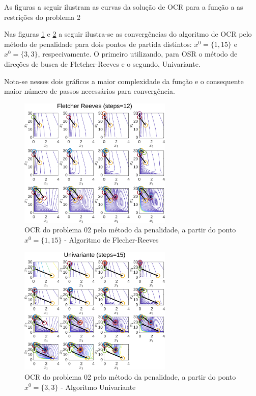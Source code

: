 \documentclass[10pt, a4paper]{article}
\begin{document}
\newpage

As figuras a seguir ilustram as curvas da solu\c c\~ao de OCR para a fun\c c\~ao a as restri\c c\~oes do problema 2

Nas figuras \ref{fig:fig05} e \ref{fig:fig06} a seguir ilustra-se as converg\^encias do algoritmo de OCR pelo m\'etodo de penalidade para dois pontos de partida distintos: $x^0=\{1,15\}$ e $x^0=\{3,3\}$, respecivamente. O primeiro utilizando, para OSR o m\'etodo de dire\c c\~oes de busca de Fletcher-Reeves e o segundo, Univariante.

Nota-se nesses dois gr\'aficos a maior complexidade da fun\c c\~ao e o consequente maior n\'umero de passos necess\'arios para converg\^encia.

\begin{figure}[H]
      \centering
      \includegraphics[width=0.65\textwidth]{fig05_P02_PEN_X1_FR.png}
      \caption{OCR do problema 02 pelo m\'etodo da penalidade, a partir do ponto $x^0=\{1,15\}$ - Algoritmo de Flecher-Reeves}
      \label{fig:fig05}
\end{figure}
\begin{figure}[H]
      \centering
      \includegraphics[width=0.65\textwidth]{fig06_P02_PEN_X2_UNI.png}
      \caption{OCR do problema 02 pelo m\'etodo da penalidade, a partir do ponto $x^0=\{3,3\}$ - Algoritmo Univariante}
      \label{fig:fig06}
\end{figure}
\end{document}
